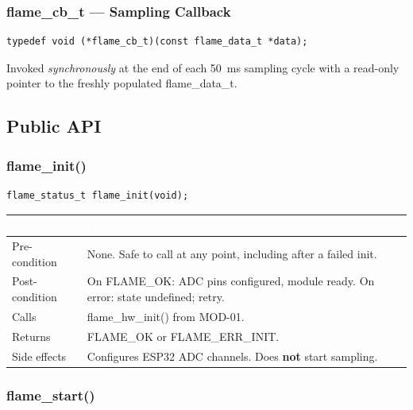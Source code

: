 \documentclass[12pt,a4paper]{article}
\newcommand{\theadtext}[1]{\textcolor{white}{\textbf{#1}}}
\newcommand{\fn}[1]{{\footnotesize\ttfamily #1}}
\begin{document}
\subsubsection{\fn{flame\_cb\_t} --- Sampling Callback}

\begin{lstlisting}[caption={Callback typedef}]
typedef void (*flame_cb_t)(const flame_data_t *data);
\end{lstlisting}

Invoked \emph{synchronously} at the end of each 50~ms sampling cycle with a
read-only pointer to the freshly populated \fn{flame\_data\_t}.


\subsection{Public API}

\subsubsection{\fn{flame\_init()}}

\begin{lstlisting}[caption={Signature}]
flame_status_t flame_init(void);
\end{lstlisting}

\begin{table}[H]\centering\small
\begin{tabularx}{\textwidth}{L{3cm} X}
\toprule
{}\theadtext{Attribute} & \theadtext{Detail} \\
\midrule
{}   Pre-condition  & None. Safe to call at any point, including after a failed init. \\
 Post-condition & On \fn{FLAME\_OK}: ADC pins configured, module ready. On error: state undefined; retry. \\
   Calls          & \fn{flame\_hw\_init()} from MOD-01. \\
 Returns        & \fn{FLAME\_OK} or \fn{FLAME\_ERR\_INIT}. \\
   Side effects   & Configures ESP32 ADC channels. Does \textbf{not} start sampling. \\
\bottomrule
\end{tabularx}
\end{table}

\subsubsection{\fn{flame\_start()}}
\end{document}
